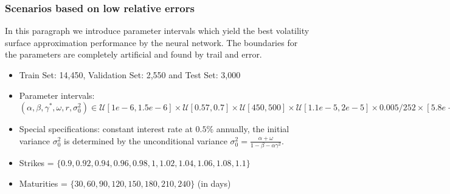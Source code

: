 \documentclass{article}
\begin{document}
\subsubsection{Scenarios based on low relative errors}\label{sec:setupomega20}
In this paragraph we introduce parameter intervals which yield the best volatility surface approximation performance by the neural network. The boundaries for the parameters are completely artificial and found by trail and error.
\begin{itemize}
    \item Train Set: 14,450, Validation Set: 2,550 and Test Set: 3,000
    \item Parameter intervals: $(\alpha, \beta, \gamma^*, \omega, r ,\sigma_0^2) \in \mathcal{U}[1e-6, 1.5e-6] \times \mathcal{U}[0.57, 0.7] \times \mathcal{U}[450, 500] \times \mathcal{U}[1.1e-5, 2e-5] \times 0.005/252 \times [5.8e-5, 2e-4]$
    \item Special specifications: constant interest rate at $0.5\%$ annually, the initial variance $\sigma_0^2$ is determined by the unconditional variance  $\sigma_0^2 = \frac{\alpha+\omega}{1-\beta-\alpha\gamma^2}$.
    \item Strikes = $\{0.9, 0.92, 0.94, 0.96, 0.98, 1, 1.02, 1.04, 1.06, 1.08, 1.1\}$
    \item Maturities = $\{30, 60, 90, 120, 150, 180, 210, 240\}$ (in days)
\end{itemize}
\end{document}
